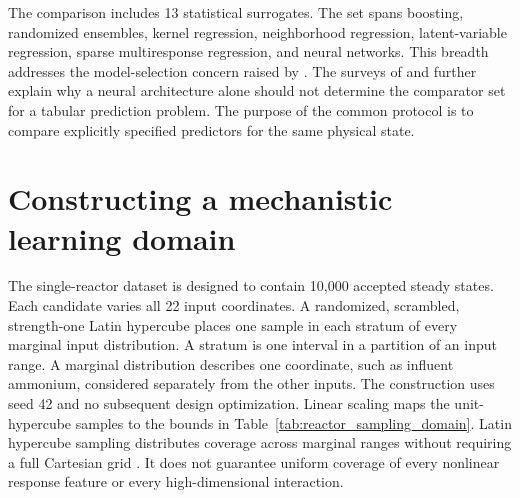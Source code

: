 The comparison includes 13 statistical surrogates. The set spans boosting, randomized ensembles, kernel regression, neighborhood regression, latent-variable regression, sparse multiresponse regression, and neural networks. This breadth addresses the model-selection concern raised by \citet{BhosekarIerapetritou2018}. The surveys of \citet{Borisov2024} and \citet{ShwartzZiv2022} further explain why a neural architecture alone should not determine the comparator set for a tabular prediction problem. The purpose of the common protocol is to compare explicitly specified predictors for the same physical state.

\section{Constructing a mechanistic learning domain}

The single-reactor dataset is designed to contain 10,000 accepted steady states. Each candidate varies all 22 input coordinates. A randomized, scrambled, strength-one Latin hypercube places one sample in each stratum of every marginal input distribution. A stratum is one interval in a partition of an input range. A marginal distribution describes one coordinate, such as influent ammonium, considered separately from the other inputs. The construction uses seed 42 and no subsequent design optimization. Linear scaling maps the unit-hypercube samples to the bounds in Table~\ref{tab:reactor_sampling_domain}. Latin hypercube sampling distributes coverage across marginal ranges without requiring a full Cartesian grid \citep{McKay1979}. It does not guarantee uniform coverage of every nonlinear response feature or every high-dimensional interaction.

